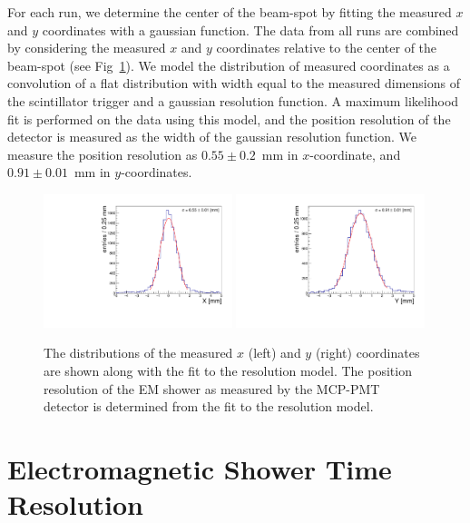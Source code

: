 \documentclass[12pt]{article}
\begin{document}
For each run, we determine the center of the beam-spot by fitting the measured
$x$ and $y$ coordinates with a gaussian function. The data from all runs are
combined by considering the measured $x$ and $y$ coordinates relative to the
center of the beam-spot (see Fig~\ref{fig:ResolutionMeasurement}). We model the
distribution of measured coordinates as a convolution of a flat distribution
with width equal to the measured dimensions of the scintillator trigger and a
gaussian resolution function. A maximum likelihood fit is performed on the data
using this model, and the position resolution of the detector is measured as the
width of the gaussian resolution function. We measure the position resolution as
$0.55\pm0.2$~mm in $x$-coordinate, and $0.91\pm 0.01$~mm in $y$-coordinates.

\begin{figure}[htbp] \centering
\includegraphics[width=0.49\textwidth]{Images/XYResolution/X_Resolution_fixedTrigger.pdf}
\includegraphics[width=0.49\textwidth]{Images/XYResolution/Y_Resolution_fixedTrigger.pdf}
\caption{The distributions of the measured $x$ (left) and $y$ (right)
coordinates are shown along with the fit to the resolution model. The position
resolution of the EM shower as measured by the MCP-PMT detector is determined from
the fit to the resolution model. } \label{fig:ResolutionMeasurement}
\end{figure}

\section{ Electromagnetic Shower Time Resolution } 
\label{sec:timing} 
\end{document}
